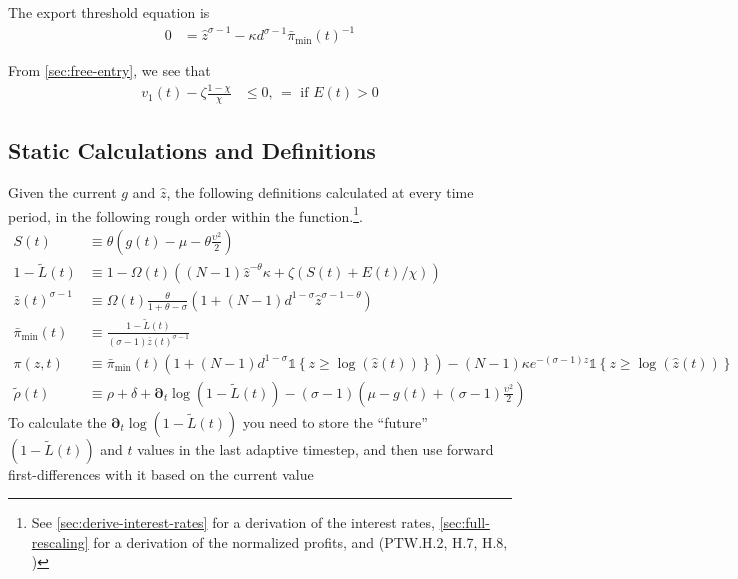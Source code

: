 \documentclass[11pt]{article}
\newcommand{\D}[1][]{\ensuremath{\boldsymbol{\partial}_{#1}}}
\newcommand{\indicator}[1]{\ensuremath{\mathds{1}\left\{{#1}\right\}}}
\begin{document}
The export threshold equation is
\begin{align}
	0&=\hat{z}^{\sigma-1}-  \kappa d^{\sigma - 1} \bar{\pi}_{\min}(t)^{-1}
\end{align}

From \cref{sec:free-entry}, we see that
\begin{align}
	v_1(t) -  \zeta \frac{1-\chi}{\chi} &\leq 0,\, = \text{ if } E(t) > 0
\end{align}


\subsection{Static Calculations and Definitions}
Given the current $g$ and $\hat{z}$, the following definitions calculated at every time period, in the following rough order within the function.\footnote{See \cref{sec:derive-interest-rates} for a derivation of the interest rates, \cref{sec:full-rescaling} for a derivation of the normalized profits, and (PTW.H.2, H.7, H.8, )}.
\begin{align}
	S(t) &\equiv \theta \left( g(t) - \mu - \theta\frac{\upsilon^2}{2}\right)\\
	1 - \tilde{L}(t) &\equiv 1 - \Omega(t)\left((N -1)\hat{z}^{-\theta}\kappa + \zeta \left(S(t) + E(t)/\chi \right)\right)\\
	\bar{z}(t)^{\sigma - 1}&\equiv \Omega(t)
\frac{\theta}{1+\theta - \sigma}\left(1 + (N-1)d^{1-\sigma}\hat{z}^{\sigma - 1 -\theta} \right)\\
	\bar{\pi}_{\min}(t) &\equiv \frac{1-\tilde{L}(t)}{(\sigma-1)\bar{z}(t)^{\sigma-1}}\\
	\pi(z,t) &\equiv \bar{\pi}_{\min}(t)\left(1 + (N-1)d^{1-\sigma}\indicator{z \geq \log(\hat{z}(t))}\right) - (N-1)\kappa e^{-(\sigma - 1)z}\indicator{z \geq \log(\hat{z}(t))}\\
	\tilde{\rho}(t) &\equiv \rho+ \delta + \D[t]\log\left(1 - \tilde{L}(t)\right) - (\sigma - 1)\left(\mu - g(t) + (\sigma - 1)\frac{\upsilon^2}{2} \right)
\end{align}
To calculate the $\D[t]\log\left(1 - \tilde{L}(t)\right)$ you need to store the ``future'' $\left(1 - \tilde{L}(t)\right)$ and $t$ values in the last adaptive timestep, and then use forward first-differences with it based on the current value
\end{document}
